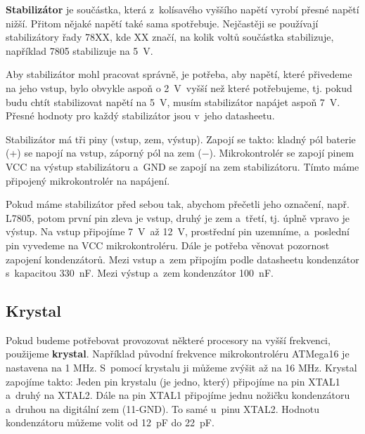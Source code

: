 {\bf Stabilizátor} je součástka, která z~kolísavého vyššího napětí vyrobí přesné napětí nižší. Přitom nějaké napětí také sama spotřebuje. 
Nejčastěji se používají stabilizátory řady 78XX, kde XX značí, na kolik voltů součástka stabilizuje, například 7805 stabilizuje na 5~V.  \label{7805}

Aby stabilizátor mohl pracovat správně, je potřeba, aby napětí, které přivedeme na jeho vstup,
 bylo obvykle aspoň o 2~V~vyšší než které potřebujeme, tj. pokud budu chtít stabilizovat napětí na 5~V, 
 musím stabilizátor napájet aspoň 7~V. Přesné hodnoty pro každý stabilizátor jsou v~jeho datasheetu. 

Stabilizátor má tři piny (vstup, zem, výstup). Zapojí se takto: kladný pól baterie (+) se napojí na vstup, záporný pól na zem ($-$). 
Mikrokontrolér se zapojí pinem VCC na výstup stabilizátoru a~GND  se zapojí na zem stabilizátoru. 
Tímto máme připojený mikrokontrolér na napájení.


Pokud máme stabilizátor před sebou tak, abychom přečetli jeho označení, např. L7805, 
potom první pin zleva je vstup, druhý je zem a~třetí, tj. úplně vpravo je výstup. 
Na vstup připojíme 7~V~až 12~V, prostřední pin uzemníme, a~poslední pin vyvedeme na VCC mikrokontroléru. 
Dále je potřeba věnovat pozornost zapojení kondenzátorů. 
Mezi vstup a~zem připojím podle datasheetu kondenzátor s~kapacitou 330~nF. Mezi výstup a~zem kondenzátor 100~nF. 


\subsection{Krystal}
Pokud budeme potřebovat provozovat některé procesory na vyšší frekvenci, použijeme {\bf krystal}. 
Například původní frekvence mikrokontroléru ATMega16 je nastavena na 1 MHz. S~pomocí krystalu ji můžeme zvýšit až na 16 MHz. 
Krystal zapojíme takto: Jeden pin krystalu (je jedno, který) připojíme na pin XTAL1 a~druhý na XTAL2. 
Dále na pin XTAL1 připojíme jednu nožičku kondenzátoru a~druhou na digitální zem (11-GND). 
To samé u~pinu XTAL2. Hodnotu kondenzátoru můžeme volit od 12~pF do 22~pF.



